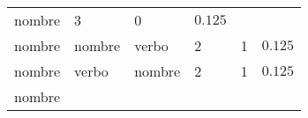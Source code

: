 \documentclass[12pt,spanish,a4paper,]{article}
\begin{document}
\begin{longtable}[]{@{}llllll@{}}
\begin{minipage}[t]{0.13\columnwidth}
nombre\strut
\end{minipage} & \begin{minipage}[t]{0.07\columnwidth}\raggedright
3\strut
\end{minipage} & \begin{minipage}[t]{0.07\columnwidth}\raggedright
0\strut
\end{minipage} & \begin{minipage}[t]{0.32\columnwidth}\raggedright
\(0.125\)\strut
\end{minipage}\tabularnewline
\begin{minipage}[t]{0.13\columnwidth}\raggedright
nombre\strut
\end{minipage} & \begin{minipage}[t]{0.13\columnwidth}\raggedright
nombre\strut
\end{minipage} & \begin{minipage}[t]{0.13\columnwidth}\raggedright
verbo\strut
\end{minipage} & \begin{minipage}[t]{0.07\columnwidth}\raggedright
2\strut
\end{minipage} & \begin{minipage}[t]{0.07\columnwidth}\raggedright
1\strut
\end{minipage} & \begin{minipage}[t]{0.32\columnwidth}\raggedright
\(0.125\)\strut
\end{minipage}\tabularnewline
\begin{minipage}[t]{0.13\columnwidth}\raggedright
nombre\strut
\end{minipage} & \begin{minipage}[t]{0.13\columnwidth}\raggedright
verbo\strut
\end{minipage} & \begin{minipage}[t]{0.13\columnwidth}\raggedright
nombre\strut
\end{minipage} & \begin{minipage}[t]{0.07\columnwidth}\raggedright
2\strut
\end{minipage} & \begin{minipage}[t]{0.07\columnwidth}\raggedright
1\strut
\end{minipage} & \begin{minipage}[t]{0.32\columnwidth}\raggedright
\(0.125\)\strut
\end{minipage}\tabularnewline
\begin{minipage}[t]{0.13\columnwidth}\raggedright
nombre\strut
\end{minipage} & \begin{minipage}[t]{0.13\columnwidth}\raggedright

\end{minipage}
\end{longtable}
\end{document}
